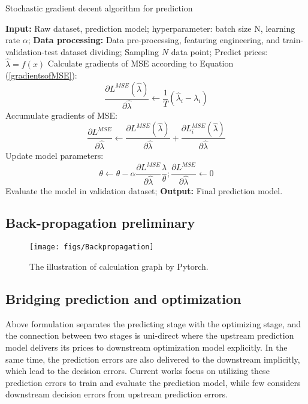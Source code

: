 \documentclass[journal]{IEEEtran}
\newcommand{\slw}{\color{blue}}
\begin{document}
\begin{algorithm}[!t]
  \label{SGDPred}
  \caption{Stochastic gradient decent algorithm for prediction}
  {{
    \begin{algorithmic}[1]
      \STATE \textbf{Input:} Raw dataset, prediction model; hyperparameter: batch size N, learning rate $\alpha$;
      \STATE \textbf{Data processing:} Data pre-processing, featuring engineering, and train-validation-test dataset dividing; 
      \STATE Sampling $N$ data point; 
      \STATE Predict prices: $\hat{\lambda} = f(x)$
      \STATE Calculate gradients of MSE according to Equation (\ref{gradientsofMSE}): $$\frac{\partial L^{MSE}(\hat{\lambda}) }{\partial \hat{\lambda}} \leftarrow  \frac{1}{T} (\hat{\lambda}_i - \lambda_i)$$
      \STATE Accumulate gradients of MSE: $$ \frac{\partial L^{MSE} }{\partial \hat{\lambda}} \leftarrow \frac{\partial L^{MSE}(\hat{\lambda}) }{\partial \hat{\lambda}} + \frac{\partial L_i^{MSE}(\hat{\lambda})}{\partial \hat{\lambda}}$$
      \ENDFOR
      \STATE Update model parameters: $$\theta \leftarrow \theta - \alpha \frac{\partial L^{MSE}}{\partial \hat{\lambda}} \frac{\hat{\lambda}}{\theta}; \frac{\partial L^{MSE}}{\partial \hat{\lambda}} \leftarrow 0$$
      \STATE Evaluate the model in validation dataset;
      \ENDWHILE
      \STATE \textbf{Output:} Final prediction model.
    \end{algorithmic}
  }}
\end{algorithm}

\subsection{Back-propagation preliminary}

{\slw{Explain the back-propagation procedures preliminaries}}

\begin{figure}[ht]
  \centering
  \texttt{[image: figs/Backpropagation]}
  \caption{The illustration of calculation graph by Pytorch.}
  \label{Backpropagation}
\end{figure}


\subsection{Bridging prediction and optimization}
Above formulation separates the predicting stage with the optimizing stage, and the connection between two stages is uni-direct where the upstream prediction model delivers its prices to downstream optimization model explicitly. In the same time, the prediction errors are also delivered to the downstream implicitly, which lead to the decision errors. Current works \cite{Shi2021,Chang2019,Qiao2020,Gonzalez2018,Diaz2019} focus on utilizing these prediction errors to train and evaluate the prediction model, while few considers downstream decision errors from upstream prediction errors. 
\end{document}
